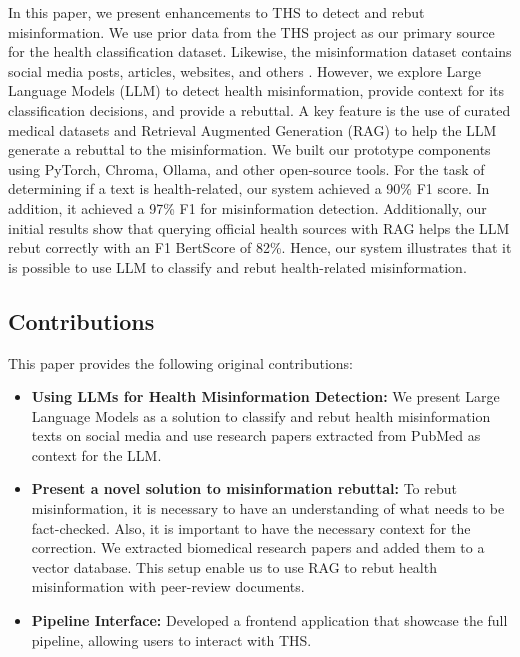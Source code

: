 In this paper, we present enhancements to THS to detect and rebut misinformation. 
We use prior data from the THS project as our primary source for the health classification dataset. Likewise, the misinformation dataset contains social media posts, articles,
websites, and others \cite{stephencrone2022,coviddata,covidunesco}. 
However, we explore  Large Language Models (LLM)  to detect health misinformation, provide context for its classification decisions, and provide a rebuttal.  A key feature is the use of 
curated medical datasets and Retrieval Augmented Generation (RAG) to help the LLM generate a rebuttal to the misinformation.
We built our prototype components using PyTorch, Chroma, Ollama, and other open-source tools. For the task of determining if a text is health-related, our system achieved a 90\% F1 score. In addition, it achieved a 97\% F1 for misinformation detection. Additionally, our initial results show that querying  official health sources with RAG helps the LLM rebut correctly with an F1 BertScore of 82\%. Hence, our system illustrates that it is possible to use LLM to classify and rebut health-related misinformation. 

\subsection{Contributions}
This paper provides the following original contributions:
\begin{itemize}
	\item{\textbf{Using LLMs for Health Misinformation Detection:}} 
	 We present Large Language Models as a solution to classify and rebut health misinformation texts on social media and use research papers extracted from PubMed as context for the LLM.
	\item{\textbf{Present a novel solution to misinformation rebuttal:}} To rebut misinformation, it is necessary to have an understanding of what needs to be fact-checked. Also, it is important to have the necessary context for the correction. We extracted biomedical research papers and added them to a vector database. This setup enable us to use RAG to rebut health misinformation with peer-review documents.
	\item{\textbf{Pipeline Interface:}} Developed a frontend application that showcase the full pipeline, allowing users to interact with THS.
\end{itemize}


